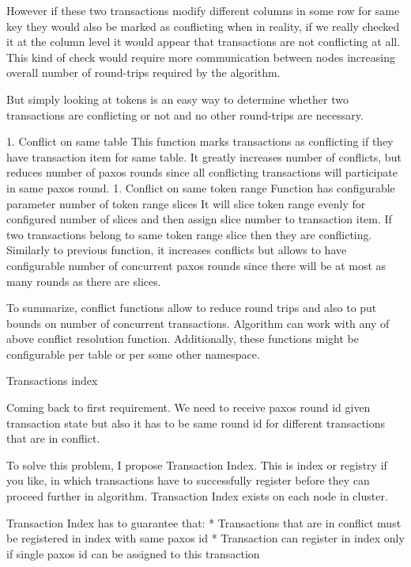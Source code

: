 However if these two transactions modify different columns in some row for same key they would also be marked as conflicting when in reality, if we really checked it at the column level it would appear that transactions are not conflicting at all. This kind of check would require more communication between nodes increasing overall number of round-trips required by the algorithm.


But simply looking at tokens is an easy way to determine whether two transactions are conflicting or not and no other round-trips are necessary.


1. Conflict on same table
        This function marks transactions as conflicting if they have transaction item for same table. It greatly increases number of conflicts, but reduces number of paxos rounds since all conflicting transactions will participate in same paxos round.
1. Conflict on same token range
        Function has configurable parameter number of token range slices
        It will slice token range evenly for configured number of slices and then assign slice number to transaction item. If two transactions belong to same token range slice then they are conflicting.
        Similarly to previous function, it increases conflicts but allows to have configurable number of concurrent paxos rounds since there will be at most as many rounds as there are slices.


To summarize, conflict functions allow to reduce round trips and also to put bounds on number of concurrent transactions. Algorithm can work with any of above conflict resolution function. Additionally, these functions might be configurable per table or per some other namespace. 




        Transactions index


Coming back to first requirement. We need to receive paxos round id given transaction state but also it has to be same round id for different transactions that are in conflict.


To solve this problem, I propose Transaction Index. This is index or registry if you like, in which transactions have to successfully register before they can proceed further in algorithm.        Transaction Index exists on each node in cluster.


Transaction Index has to guarantee that:
* Transactions that are in conflict must be registered in index with same paxos id
* Transaction can register in index only if single paxos id can be assigned to this transaction


